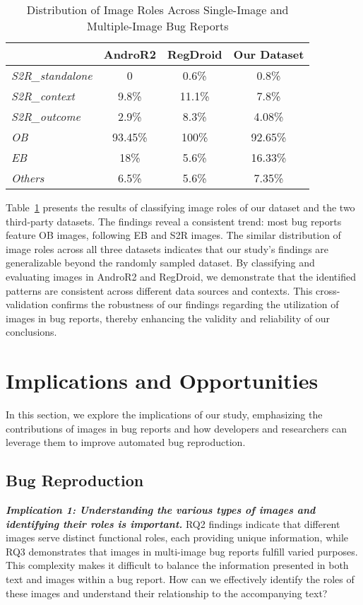 \begin{table}[h]
\centering
\caption{Distribution of Image Roles Across Single-Image and Multiple-Image Bug Reports}
\label{tab:genreal}
\small
\begin{tabular}{|l|c|c|c|}
\hline
 \rowcolor{gray!45}            & AndroR2 & RegDroid &  \textbf{Our Dataset}\\ \hline\hline
 
\textit{S2R\_standalone}   & 0  & 0.6\% &  0.8\%\\ \hline
\textit{S2R\_context}   & 9.8\%  &  11.1\%  &   7.8\%\\ \hline
\textit{S2R\_outcome}   & 2.9\%  & 8.3\% &  4.08\% \\ \hline
\textit{OB}  &  93.45\% &  100\% & 92.65\% \\ \hline
\textit{EB}  & 18\%  &  5.6\% & 16.33\% \\ \hline
\textit{Others}   & 6.5\%  & 5.6\% & 7.35\% \\ \hline


\end{tabular}

\end{table}
 Table~\ref{tab:genreal} presents the results of classifying image roles of our dataset and the two third-party datasets. The findings reveal a consistent trend: most bug reports feature OB images, following EB and S2R images. The similar distribution of image roles across all three datasets indicates that our study's findings are generalizable beyond the randomly sampled dataset. By classifying and evaluating images in AndroR2 and RegDroid, we demonstrate that the identified patterns are consistent across different data sources and contexts. This cross-validation confirms the robustness of our findings regarding the utilization of images in bug reports, thereby enhancing the validity and reliability of our conclusions.


\section{Implications and Opportunities}

In this section, we explore the implications of our study, emphasizing the contributions of images in bug reports and how developers and researchers can leverage them to improve automated bug reproduction.

\subsection{Bug Reproduction}
\noindent
\textbf{\emph{Implication 1: Understanding the various types of images and identifying their roles is important.}}
RQ2 findings indicate that different images serve distinct functional roles, each providing unique information, while RQ3 demonstrates that images in multi-image bug reports fulfill varied purposes. This complexity makes it difficult to balance the information presented in both text and images within a bug report. How can we effectively identify the roles of these images and understand their relationship to the accompanying text?

